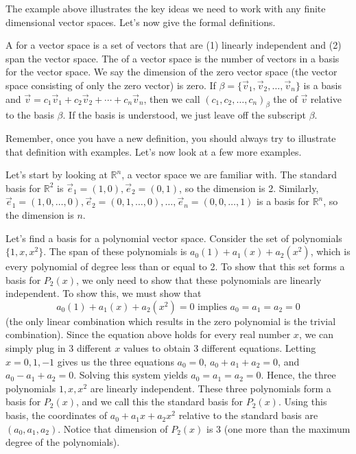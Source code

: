 The example above illustrates the key ideas we need to work with any finite dimensional vector spaces.  Let's now give the formal definitions.

\begin{definition}
A  for a vector space is a set of vectors that are 
(1) linearly independent and (2) span the vector space.
The  of a vector space is the number of vectors in a basis for the vector space. 
We say the dimension of the zero vector space (the vector space consisting of only the zero vector) is zero. 
If $\beta=\{\vec v_1,\vec v_2,\ldots,\vec v_n\}$ is a basis and $\vec v = c_1\vec v_1+c_2\vec v_2+\cdots+c_n\vec v_n$, then we call $(c_1,c_2,\ldots,c_n)_\beta$ the  of $\vec v$ relative to the basis $\beta$. 
If the basis is understood, we just leave off the subscript $\beta$.
\end{definition}

Remember, once you have a new definition, you should always try to illustrate that definition with examples.  Let's now look at a few more examples. 
\begin{example} Let's start by looking at $\mathbb{R}^n$, a vector space we are familiar with.
The standard basis for ${\mathbb{R}}^2$ is $\vec e_1 = (1,0),\vec e_2=(0,1)$, so the dimension is 2. 
Similarly,  $\vec e_1 = (1,0,\ldots,0),\vec e_2=(0,1,\ldots,0), \ldots, \vec e_n=(0,0,\ldots,1)$ is a basis for ${\mathbb{R}}^n$, so the dimension is $n$.  
\end{example}

\begin{example}
Let's find a basis for a polynomial vector space. 
Consider the set of polynomials $\{1, x, x^2\}$. The span of these polynomials is $a_0(1)+a_1(x)+a_2(x^2)$, which is every polynomial of degree less than or equal to 2. 
To show that this set forms a basis for $P_2(x)$, we only need to show that these polynomials are linearly independent.  
To show this, we must show that $$a_0(1)+a_1(x)+a_2(x^2) = 0 \text{ implies } a_0=a_1=a_2=0$$ (the only linear combination which results in the zero polynomial is the trivial combination).  
Since the equation above holds for every real number $x$, we can simply plug in 3 different $x$ values to obtain 3 different equations. Letting $x=0,1,-1$ gives us the three equations $a_0=0$, $a_0+a_1+a_2=0$, and $a_0-a_1+a_2=0$. Solving this system yields $a_0=a_1=a_2=0$. Hence, the three polynomials $1, x, x^2$ are linearly independent.  
These three polynomials form a basis for $P_2(x)$, and we call this the standard basis for $P_2(x)$.  Using this basis, the coordinates of $a_0+a_1x+a_2x^2$ relative to the standard basis are $(a_0,a_1,a_2)$.
Notice that dimension of $P_2(x)$ is 3 (one more than the maximum degree of the polynomials). 
%
\end{example}


